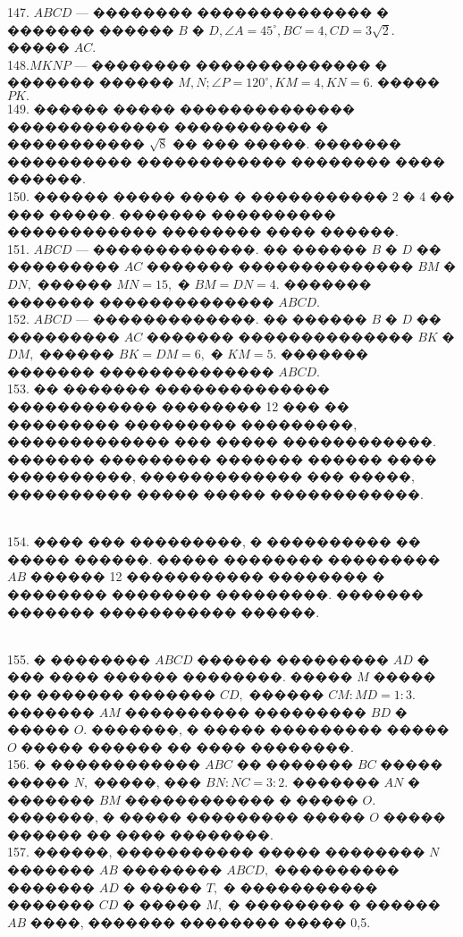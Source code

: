 \documentclass[12pt]{article}
\begin{document}
147. $ABCD$ --- �������� �������������� � ������� ������ $B$ � $D,\angle A=45^\circ, BC=4, CD=3\sqrt{2}.$ ����� $AC.$\\
148.$MKNP$ --- �������� �������������� � ������� ������ $M, N; \angle P=120^\circ, KM=4, KN=6.$ ����� $PK.$\\
149. ������ ����� �������������� ������������� ����������� � ����������� $\sqrt{8}$ �� ��� �����. ������� ���������� ������������ �������� ���� ������.\\
150. ������ ����� ���� � ����������� 2 � 4 �� ��� �����. ������� ���������� ������������ ��������
���� ������.\\
151. $ABCD$ --- �������������. �� ������ $B$ � $D$ �� ��������� $AC$ ������� �������������� $BM$ � $DN,$
������ $MN=15,$ � $BM=DN=4.$ ������� ������� �������������� $ABCD.$\\
152. $ABCD$ --- �������������. �� ������ $B$ � $D$ �� ��������� $AC$ ������� �������������� $BK$ � $DM,$ ������ $BK=DM=6,$ � $KM=5.$ ������� ������� �������������� $ABCD.$\\
153. �� ������� �������������� ������������ �������� 12 ��� �� ��������� ��������� ���������, ������������� ��� ����� ������������. ������� ��������� ������� ������ ���� ����������, ������������� ��� �����, ���������� ����� ����� ������������.
\begin{figure}[h]
\end{figure}\\
154. ���� ��� ���������, � ���������� �� ����� ������.
����� �������� ��������� $AB$ ������ 12 ����������� �������� � ��������
�������� ���������. ������� ������� ����������� ������.
\begin{figure}[h]
\end{figure}\\
155. � �������� $ABCD$ ������ ��������� $AD$ � ��� ���� ������ ��������. ����� $M$ ����� �� �������
������� $CD,$ ������ $CM:MD=1:3.$ ������� $AM$ ���������� ��������� $BD$ � ����� $O.$ �������, �
����� ��������� ����� $O$ ����� ������ �� ���� ��������.\\
156. � ������������ $ABC$ �� ������� $BC$ ����� ����� $N,$ �����, ��� $BN : NC=3:2.$ ������� $AN$ � �������
$BM$ ������������ � ����� $O.$ �������, � ����� ��������� ����� $O$ ����� ������ �� ���� ��������.\\
157. ������, ����������� ����� �������� $N$ ������� $AB$ �������� $ABCD,$ ���������� ������� $AD$ � �����
$T,$ � ����������� ������� $CD$ � ����� $M,$ � �������� � ������ $AB$ ����, ������� �������� ����� 0,5.
\end{document}
